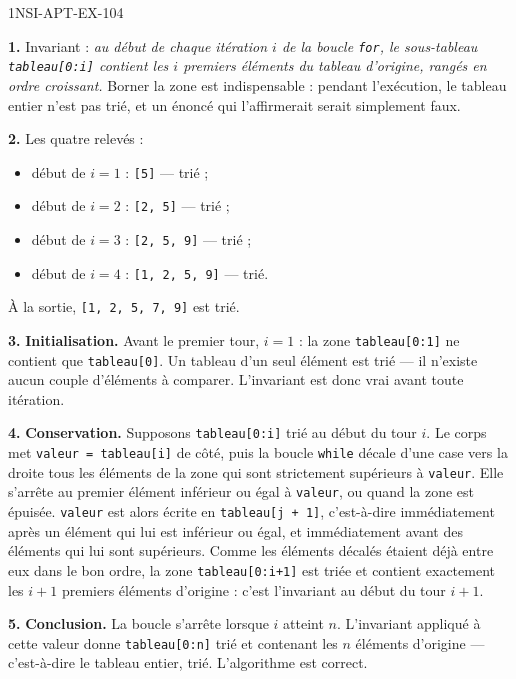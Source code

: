 \begin{corrige}{1NSI-APT-EX-104}

\textbf{1.} Invariant : \emph{au début de chaque itération $i$ de la boucle
\lstinline{for}, le sous-tableau \lstinline{tableau[0:i]} contient les $i$ premiers
éléments du tableau d'origine, rangés en ordre croissant.} Borner la zone est
indispensable : pendant l'exécution, le tableau entier n'est pas trié, et un énoncé qui
l'affirmerait serait simplement faux.

\textbf{2.} Les quatre relevés :
\begin{itemize}
  \item début de $i=1$ : \lstinline{[5]} — trié ;
  \item début de $i=2$ : \lstinline{[2, 5]} — trié ;
  \item début de $i=3$ : \lstinline{[2, 5, 9]} — trié ;
  \item début de $i=4$ : \lstinline{[1, 2, 5, 9]} — trié.
\end{itemize}
À la sortie, \lstinline{[1, 2, 5, 7, 9]} est trié.

\textbf{3.} \textbf{Initialisation.} Avant le premier tour, $i=1$ : la zone
\lstinline{tableau[0:1]} ne contient que \lstinline{tableau[0]}. Un tableau d'un seul
élément est trié — il n'existe aucun couple d'éléments à comparer. L'invariant est donc
vrai avant toute itération.

\textbf{4.} \textbf{Conservation.} Supposons \lstinline{tableau[0:i]} trié au début du tour
$i$. Le corps met \lstinline{valeur = tableau[i]} de côté, puis la boucle
\lstinline{while} décale d'une case vers la droite tous les éléments de la zone qui sont
strictement supérieurs à \lstinline{valeur}. Elle s'arrête au premier élément inférieur ou
égal à \lstinline{valeur}, ou quand la zone est épuisée. \lstinline{valeur} est alors écrite
en \lstinline{tableau[j + 1]}, c'est-à-dire immédiatement après un élément qui lui est
inférieur ou égal, et immédiatement avant des éléments qui lui sont supérieurs. Comme les
éléments décalés étaient déjà entre eux dans le bon ordre, la zone
\lstinline{tableau[0:i+1]} est triée et contient exactement les $i+1$ premiers éléments
d'origine : c'est l'invariant au début du tour $i+1$.

\textbf{5.} \textbf{Conclusion.} La boucle s'arrête lorsque $i$ atteint $n$. L'invariant
appliqué à cette valeur donne \lstinline{tableau[0:n]} trié et contenant les $n$ éléments
d'origine — c'est-à-dire le tableau entier, trié. L'algorithme est correct.


\end{corrige}
